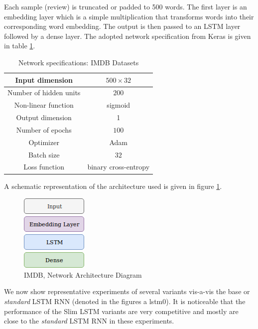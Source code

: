 \documentclass{article}
\begin{document}
{{{{{{Each sample (review) is truncated or padded to 500 words. The first layer is an embedding layer which is a simple multiplication that transforms words into their corresponding word embedding. The output is then passed to an LSTM layer followed by a dense layer. The adopted network specification from Keras is given in table \ref{sp-im}.


\begin{table}[ht]
	\caption{Network specifications: IMDB Datasets}
	\centering
	\begin{tabular}{| c | c |}
		\hline
		Input dimension & $500 \times 32$ \\
		\hline
		Number of hidden units & $200$ \\
		\hline
		Non-linear function & sigmoid \\
		\hline
		Output dimension & 1 \\
		\hline
		Number of epochs & $ 100 $ \\
		\hline
		Optimizer  & Adam  \\
		\hline
		Batch size & $32$ \\
		\hline
		Loss function & binary cross-entropy\\
		\hline
	\end{tabular}
	\label{sp-im}
\end{table}

A schematic representation of the architecture used is given in figure \ref{im-mdl}.


\begin{figure}[H]
	\centering
	\includegraphics[trim={0 0 0 0},clip,scale=0.48]{imdb.png}
	\caption{IMDB,  Network Architecture Diagram}
	\label{im-mdl}
\end{figure}

We now show representative experiments of several variants vis-a-vis the base or \textit{standard} LSTM RNN (denoted in the figures a lstm0). It is noticeable that the performance of the Slim LSTM variants are very competitive and mostly are close to the \textit{standard} LSTM RNN in these experiments.

}}}}}}
\end{document}
